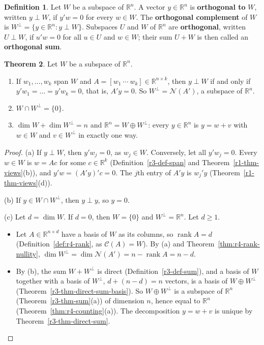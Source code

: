 \documentclass[12pt]{article}
\newcommand{\R}{\mathbb R}
\DeclareMathOperator{\rank}{rank}
\theoremstyle{definition}
\newtheorem{theorem}{Theorem}
\newtheorem{definition}[theorem]{Definition}
\begin{document}
\begin{definition}\label{r6-def-complement}
Let \(W\) be a subspace of \(\R^n\). A vector \(y\in\R^n\) is \textbf{orthogonal to} \(W\), written
\(y\perp W\), if \(y'w=0\) for every \(w\in W\). The \textbf{orthogonal complement} of \(W\) is
\(W^\perp=\{y\in\R^n:y\perp W\}\). Subspaces \(U\) and \(W\) of \(\R^n\) are \textbf{orthogonal}, written
\(U\perp W\), if \(u'w=0\) for all \(u\in U\) and \(w\in W\); their sum \(U+W\) is then called an
\textbf{orthogonal sum}.
\end{definition}

\begin{theorem}\label{r6-thm-complement}
Let \(W\) be a subspace of \(\R^n\).
\begin{enumerate}
\item If \(w_1,\dots,w_k\) span \(W\) and \(A=[w_1\ \cdots\ w_k]\in\R^{n\times k}\), then \(y\perp W\) if and
only if \(y'w_1=\dots=y'w_k=0\), that is, \(A'y=0\). So \(W^\perp=\mathcal N(A')\), a subspace of \(\R^n\).
\item \(W\cap W^\perp=\{0\}\).
\item \(\dim W+\dim W^\perp=n\) and \(\R^n=W\oplus W^\perp\): every \(y\in\R^n\) is \(y=w+v\) with \(w\in W\)
and \(v\in W^\perp\) in exactly one way.
\end{enumerate}
\end{theorem}
\begin{proof}
(a) If \(y\perp W\), then \(y'w_j=0\), as \(w_j\in W\). Conversely, let all \(y'w_j=0\). Every \(w\in W\)
is \(w=Ac\) for some \(c\in\R^k\) (Definition~\ref{r3-def-span} and Theorem~\ref{r1-thm-views}(b)), and
\(y'w=(A'y)'c=0\). The \(j\)th entry of \(A'y\) is \(w_j'y\) (Theorem~\ref{r1-thm-views}(d)).

(b) If \(y\in W\cap W^\perp\), then \(y\perp y\), so \(y=0\).

(c) Let \(d=\dim W\). If \(d=0\), then \(W=\{0\}\) and \(W^\perp=\R^n\). Let \(d\geqslant1\).
\begin{itemize}
\item Let \(A\in\R^{n\times d}\) have a basis of \(W\) as its columns, so \(\rank A=d\) (Definition~\ref{def:r4-rank}, as \(\mathcal C(A)=W\)). By (a) and
Theorem~\ref{thm:r4-rank-nullity}, \(\dim W^\perp=\dim\mathcal N(A')=n-\rank A=n-d\).
\item By (b), the sum \(W+W^\perp\) is direct (Definition~\ref{r3-def-sum}), and a basis of \(W\)
together with a basis of \(W^\perp\), \(d+(n-d)=n\) vectors, is a basis of \(W\oplus W^\perp\)
(Theorem~\ref{r3-thm-direct-sum-basis}). So \(W\oplus W^\perp\) is a subspace of \(\R^n\)
(Theorem~\ref{r3-thm-sum}(a)) of dimension \(n\), hence equal to \(\R^n\)
(Theorem~\ref{thm:r4-counting}(a)). The decomposition \(y=w+v\) is unique by
Theorem~\ref{r3-thm-direct-sum}.\qedhere
\end{itemize}
\end{proof}
\end{document}
